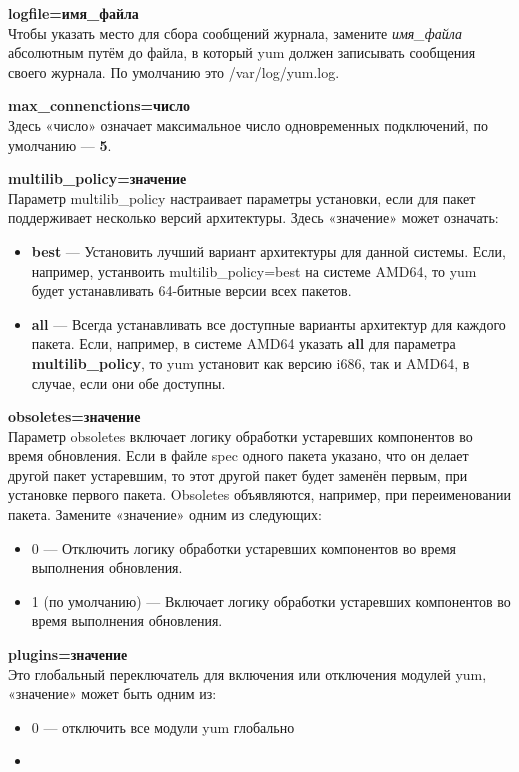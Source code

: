\documentclass[a4paper,10pt,twoside]{article}
\begin{document}
\textbf{logfile=имя\_файла}\\
Чтобы указать место для сбора сообщений журнала, замените \textit{имя\_файла} абсолютным путём до файла, в который yum должен записывать сообщения своего журнала. По умолчанию это /var/log/yum.log.

\textbf{max\_connenctions=число}\\
Здесь «число» означает максимальное число одновременных подключений, по умолчанию — \textbf{5}.

\textbf{multilib\_policy=значение}\\
Параметр multilib\_policy настраивает параметры установки, если для пакет поддерживает несколько версий архитектуры. Здесь «значение» может означать:

\begin{itemize}
 \item \textbf{best} — Установить лучший вариант архитектуры для данной системы. Если, например, устанвоить multilib\_policy=best на системе AMD64, то yum будет устанавливать 64-битные версии всех пакетов.
\item \textbf{all} — Всегда устанавливать все доступные варианты архитектур для каждого пакета. Если, например, в системе AMD64 указать \textbf{all} для параметра \textbf{multilib\_policy}, то yum установит как версию i686, так и AMD64, в случае, если они обе доступны.
\end{itemize}

\textbf{obsoletes=значение}\\
Параметр obsoletes включает логику обработки устаревших компонентов во время обновления. Если в файле spec одного пакета указано, что он делает другой пакет устаревшим, то этот другой пакет будет заменён первым, при установке первого пакета. Obsoletes объявляются, например, при переименовании пакета. Замените «значение» одним из следующих:

\begin{itemize}
\item 0 — Отключить логику обработки устаревших компонентов во время выполнения обновления.
\item 1 (по умолчанию) — Включает логику обработки устаревших компонентов во время выполнения обновления.
\end{itemize}

\textbf{plugins=значение}\\
Это глобальный переключатель для включения или отключения модулей yum, «значение» может быть одним из:
\begin{itemize}
 \item 0 — отключить все модули yum глобально
 \item 
 \end{itemize}
 
\end{document}
